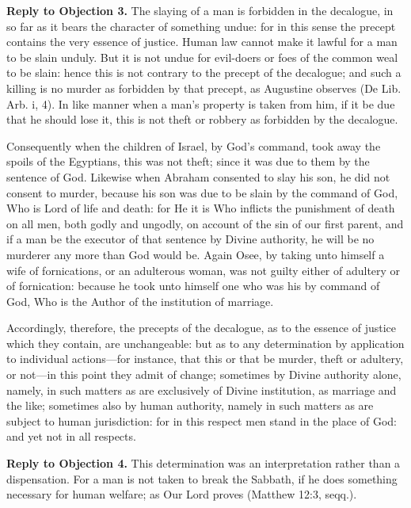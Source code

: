 \textbf{Reply to Objection 3.} The slaying of a man is forbidden in the decalogue, in so far as it bears the character of something undue: for in this sense the precept contains the very essence of justice. Human law cannot make it lawful for a man to be slain unduly. But it is not undue for evil-doers or foes of the common weal to be slain: hence this is not contrary to the precept of the decalogue; and such a killing is no murder as forbidden by that precept, as Augustine observes (De Lib. Arb. i, 4). In like manner when a man's property is taken from him, if it be due that he should lose it, this is not theft or robbery as forbidden by the decalogue.

Consequently when the children of Israel, by God's command, took away the spoils of the Egyptians, this was not theft; since it was due to them by the sentence of God. Likewise when Abraham consented to slay his son, he did not consent to murder, because his son was due to be slain by the command of God, Who is Lord of life and death: for He it is Who inflicts the punishment of death on all men, both godly and ungodly, on account of the sin of our first parent, and if a man be the executor of that sentence by Divine authority, he will be no murderer any more than God would be. Again Osee, by taking unto himself a wife of fornications, or an adulterous woman, was not guilty either of adultery or of fornication: because he took unto himself one who was his by command of God, Who is the Author of the institution of marriage.

Accordingly, therefore, the precepts of the decalogue, as to the essence of justice which they contain, are unchangeable: but as to any determination by application to individual actions—for instance, that this or that be murder, theft or adultery, or not—in this point they admit of change; sometimes by Divine authority alone, namely, in such matters as are exclusively of Divine institution, as marriage and the like; sometimes also by human authority, namely in such matters as are subject to human jurisdiction: for in this respect men stand in the place of God: and yet not in all respects.

\textbf{Reply to Objection 4.} This determination was an interpretation rather than a dispensation. For a man is not taken to break the Sabbath, if he does something necessary for human welfare; as Our Lord proves (Matthew 12:3, seqq.).


